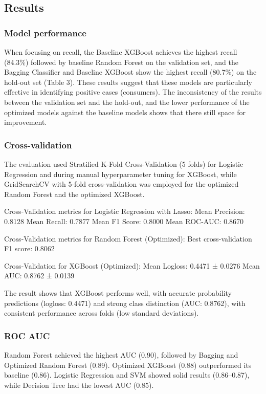 \documentclass{article}
\begin{document}
\subsection*{Results}

\subsubsection*{Model performance}

When focusing on recall, the Baseline XGBoost achieves the highest recall (84.3\%) followed by baseline Random Forest on the validation set, and the Bagging Classifier and Baseline XGBoost show the highest recall (80.7\%) on the hold-out set (Table 3). These results suggest that these models are particularly effective in identifying positive cases (consumers). The inconsistency of the results between the validation set and the hold-out, and the lower performance of the optimized models against the baseline models shows that there still space for improvement.

\subsubsection*{Cross-validation}
The evaluation used Stratified K-Fold Cross-Validation (5 folds) for Logistic Regression and during manual hyperparameter tuning for XGBoost, while GridSearchCV with 5-fold cross-validation was employed for the optimized Random Forest and the optimized XGBoost. 

Cross-Validation metrics for Logistic Regression with Lasso:
Mean Precision: 0.8128
Mean Recall: 0.7877
Mean F1 Score: 0.8000
Mean ROC-AUC: 0.8670

Cross-Validation metrics for Random Forest (Optimized):
Best cross-validation F1 score: 0.8062

Cross-Validation for XGBoost (Optimized):
Mean Logloss: 0.4471 ± 0.0276
Mean AUC: 0.8762 ± 0.0139

The result shows that XGBoost performs well, with accurate probability predictions (logloss: 0.4471) and strong class distinction (AUC: 0.8762), with consistent performance across folds (low standard deviations).


\subsubsection*{ROC AUC}

Random Forest achieved the highest AUC (0.90), followed by Bagging and Optimized Random Forest (0.89). Optimized XGBoost (0.88) outperformed its baseline (0.86). Logistic Regression and SVM showed solid results (0.86–0.87), while Decision Tree had the lowest AUC (0.85).
\end{document}

